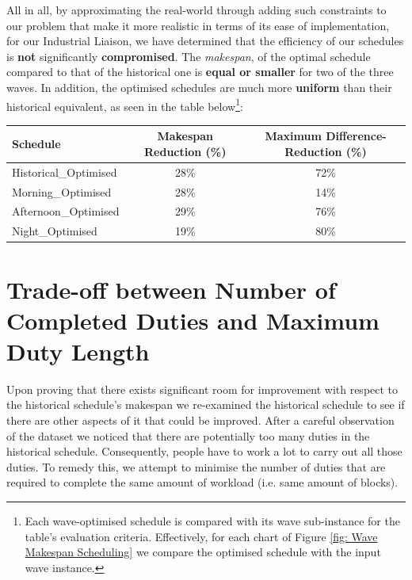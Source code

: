 \vspace{\baselineskip}
\noindent
All in all, by approximating the real-world through adding such constraints to our problem that make it more realistic in terms of its ease of implementation, for our Industrial Liaison, we have determined that the efficiency of our schedules is \textbf{not} significantly \textbf{compromised}. The \textit{makespan}, of the optimal schedule compared to that of the historical one is \textbf{equal or smaller} for two of the three waves. In addition, the optimised schedules are much more \textbf{uniform} than their historical equivalent, as seen in the table below\footnote{Each wave-optimised schedule is compared with its wave sub-instance for the table's evaluation criteria. Effectively, for each chart of Figure \ref{fig: Wave Makespan Scheduling} we compare the optimised schedule with the input wave instance.}:


\begin{table}[h]
\small
    \centering 
\begin{tabular}{l|c|c}
        \textbf{Schedule} & \textbf{Makespan Reduction (\%)} & \textbf{Maximum Difference-Reduction (\%)} \\
        \hline
         Historical\_Optimised & 28\% & 72\% \\
        \hline
         Morning\_Optimised  & 28\% & 14\% \\ 
         \hline
         Afternoon\_Optimised  & 29\% & 76\% \\ 
         \hline
         Night\_Optimised  & 19\% & 80\% \\ 
\end{tabular}
\end{table}

\section{Trade-off between Number of Completed Duties and Maximum Duty Length}
\label{section:minimise duties}
Upon proving that there exists significant room for improvement with respect to the historical schedule's makespan we re-examined the historical schedule to see if there are other aspects of it that could be improved. After a careful observation of the dataset we noticed that there are potentially too many duties in the historical schedule. Consequently, people have to work a lot to carry out all those duties. To remedy this, we attempt to minimise the number of duties that are required to complete the same amount of workload (i.e. same amount of blocks). 

